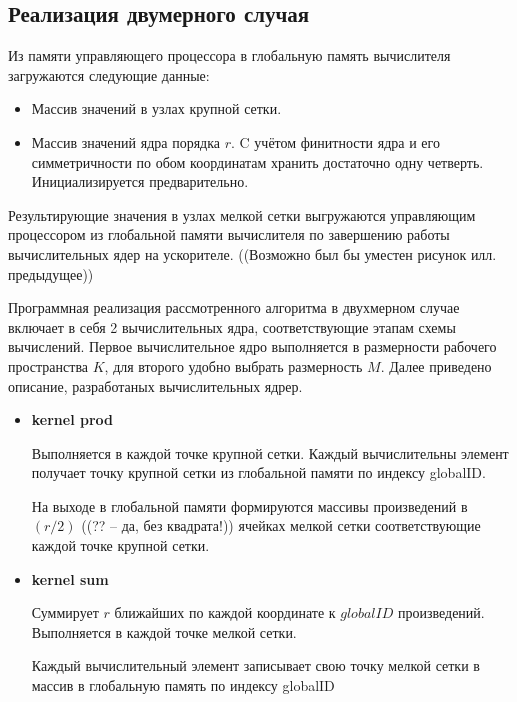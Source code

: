\subsection*{Реализация двумерного случая}

Из памяти управляющего процессора
в глобальную память вычислителя 
загружаются следующие данные: 
\begin{itemize}
\item
  Массив значений в узлах крупной сетки. %
\item
  Массив значений ядра порядка $r$. %
  C учётом финитности ядра и его симметричности по
  обом координатам хранить достаточно одну четверть.
  Инициализируется предварительно.
\end{itemize}

Результирующие значения в узлах мелкой сетки выгружаются управляющим процессором
из глобальной памяти вычислителя по завершению работы вычислительных ядер на ускорителе.
((Возможно был бы уместен рисунок илл. предыдущее))

Программная реализация рассмотренного алгоритма в двухмерном случае
включает в себя 2 вычислительных ядра, соответствующие этапам схемы вычислений.
Первое вычислительное ядро выполняется в размерности рабочего пространства $K$,
для второго удобно выбрать размерность $M$.
Далее приведено описание, разработаных вычислительных ядрер.
\begin{itemize}
\item
  {\bf kernel prod}

  Выполняется в каждой точке крупной сетки.
  Каждый вычислительны элемент 
  получает точку крупной сетки
  из глобальной памяти по индексу globalID. 
  

  На выходе в глобальной памяти
  формируются массивы произведений в $(r/2)$ ((?? -- да, без квадрата!))
  ячейках мелкой сетки  
  соответствующие каждой точке крупной сетки.

  
\item
  {\bf kernel sum}

  Суммирует $r$ ближайших по каждой координате к $globalID$ произведений. 
  Выполняется в каждой точке мелкой сетки.
  
  
  Каждый вычислительный элемент записывает свою точку мелкой сетки в
  массив в глобальную память по индексу globalID
\end{itemize}






